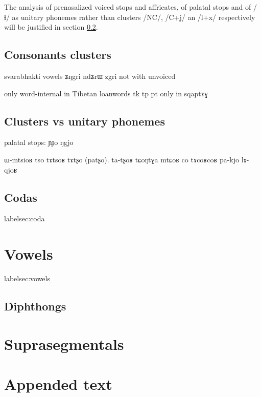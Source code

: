 \documentclass[oldfontcommands,oneside,a4paper,11pt]{article}
\newcommand{\ipa}[1]{{\phon #1}} %
\begin{document}
The analysis of prenasalized voiced stops and affricates, of palatal stops and of /ɬ/ as unitary phonemes rather than clusters /NC/, /C+j/ an /l+x/ respectively will be justified in section \ref{sec:non.clusters}. 



  \subsection{Consonants clusters} \label{sec:clusters}
  
  \citet{japhug14ideophones}
 
 svarabhakti vowels \ipa{ʑŋgri} \ipa{ndʑrɯ} \ipa{zgri} not with unvoiced
 
 only word-internal in Tibetan loanwords tk tp 
 pt only in \ipa{sqaptɤɣ}
      \subsection{Clusters vs unitary phonemes} \label{sec:non.clusters}
      
      
palatal stops:      
      \ipa{ɲɟo} \ipa{ŋgjo}
      
      ɯ-mtsioʁ
	tso tɤtsoʁ 
	tɤtʂo (patʂo). ta-tʂoʁ
 tɕoŋtɣa mtɕoʁ
 co tɤcoʁcoʁ
 pa-kjo
     lɤ-qjoʁ
      \subsection{Codas}label{sec:coda}
    
    
     \section{Vowels} label{sec:vowels}
     
          \subsection{Diphthongs}
     
     \section{Suprasegmentals}
     
         
     \section{Appended text}


\end{document}
